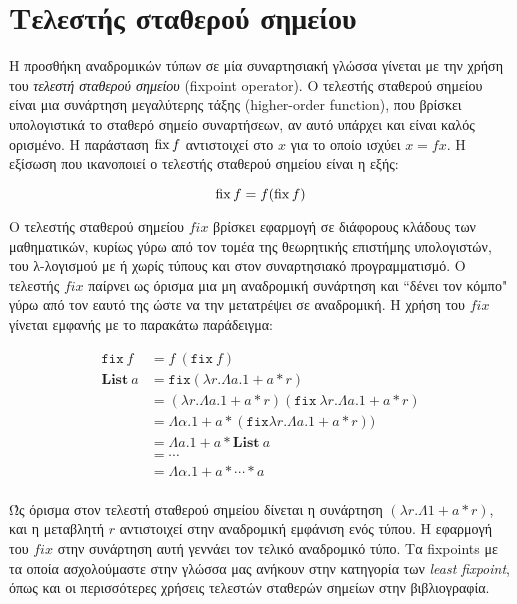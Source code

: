 
\section{Τελεστής σταθερού σημείου}

Η προσθήκη αναδρομικών τύπων σε μία συναρτησιακή γλώσσα γίνεται με την χρήση του
\emph{τελεστή σταθερού σημείου} (fixpoint operator).  Ο τελεστής σταθερού σημείου
είναι μια συνάρτηση μεγαλύτερης τάξης (higher-order function), που βρίσκει υπολογιστικά
το σταθερό σημείο συναρτήσεων, αν αυτό υπάρχει και είναι καλός ορισμένο. Η παράσταση $\operatorname{fix} f$
αντιστοιχεί στο $x$ για το οποίο ισχύει $x = f x$.  Η εξίσωση που ικανοποιεί ο τελεστής σταθερού σημείου
είναι η εξής:

\begin{displaymath}
\operatorname{fix} f = f (\operatorname{fix} f)
\end{displaymath}

Ο τελεστής σταθερού σημείου $fix$ βρίσκει εφαρμογή σε διάφορους κλάδους των μαθηματικών, κυρίως
γύρω από τον τομέα της θεωρητικής επιστήμης υπολογιστών, του λ-λογισμού με ή χωρίς τύπους και στον
συναρτησιακό προγραμματισμό. Ο τελεστής $fix$ παίρνει ως όρισμα μια μη αναδρομική συνάρτηση και
``δένει τον κόμπο" γύρω από τον εαυτό της ώστε να την μετατρέψει σε αναδρομική. Η χρήση του $fix$ γίνεται εμφανής με το παρακάτω παράδειγμα:

\begin{align*}
 \texttt{fix} \ f &= f \ (\texttt{fix} \ f)   \\
\textbf{List} ~a &= \texttt{fix} (\lambda r . \Lambda a. 1 + a * r) \\
&= (\lambda r. \Lambda a. 1 + a * r) (\texttt{fix} \ \lambda r. \Lambda a. 1 + a * r)  \\
&= \Lambda \alpha. 1 + a*(\texttt{fix} \lambda r. \Lambda a. 1 + a * r)) \\
 &= \Lambda a. 1 + a * \textbf{List} ~a \\
 &= \cdots \\
&= \Lambda \alpha. 1+ a * \cdots * a \\
\end{align*}

Ώς όρισμα στον τελεστή σταθερού σημείου δίνεται η συνάρτηση $(\lambda r. \Lambda 1 + a *r)$, και η
μεταβλητή $r$ αντιστοιχεί στην αναδρομική εμφάνιση ενός τύπου. Η εφαρμογή του $fix$ στην συνάρτηση
αυτή γεννάει τον τελικό αναδρομικό τύπο. Τα fixpoints με τα οποία ασχολούμαστε στην γλώσσα μας ανήκουν στην κατηγορία των \emph{least fixpoint}, όπως και οι περισσότερες χρήσεις τελεστών σταθερών σημείων στην βιβλιογραφία.

